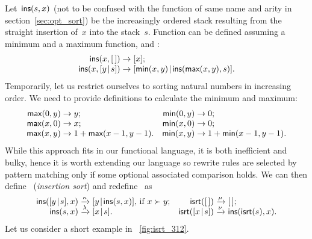 Let~\(\textsf{ins}(s,x)\) (not to be confused with
the function of same name and arity in section~\ref{sec:opt_sort}) be
the increasingly ordered stack resulting from the straight insertion
of~\(x\) into the stack~\(s\). Function  can be defined
assuming a minimum and a maximum function,
 and
:
\begin{equation*}
\begin{array}{@{}r@{\;}l@{\;}l@{}}
\fun{ins}(x,\el) & \rightarrow & [x];\\
\fun{ins}(x,\cons{y}{s}) & \rightarrow &
\cons{\fun{min}(x,y)}{\fun{ins}(\fun{max}(x,y),s)}.
\end{array}
\end{equation*}
Temporarily, let us restrict ourselves to sorting natural numbers in
increasing order. We need to provide definitions to calculate the
minimum and maximum:
\begin{equation*}
\begin{array}{@{}r@{\;}l@{\;}lr@{\;}l@{\;}l@{}}
  \fun{max}(0,y) & \rightarrow & y; & \fun{min}(0,y) & \rightarrow & 0;\\
  \fun{max}(x,0) & \rightarrow & x; & \fun{min}(x,0) & \rightarrow & 0;\\
  \fun{max}(x,y) & \rightarrow & 1 + \fun{max}(x-1,y-1).
& \fun{min}(x,y) & \rightarrow & 1 + \fun{min}(x-1,y-1).
\end{array}
\end{equation*}
While this approach fits in our functional language, it is both
inefficient and bulky, hence it is worth extending our language so
rewrite rules are selected by pattern matching only if some optional
associated comparison holds. We can then
define~ (\emph{insertion sort})
and redefine~ as
\begin{equation*}
\begin{array}{@{}r@{\;}l@{\;}lr@{\;}l@{\;}l@{}}
  \fun{ins}(\cons{y}{s},x)
& \smashedrightarrow{\kappa}
& \cons{y}{\fun{ins}(s,x)}, \,\text{if \(x \succ y\)};
& \fun{isrt}(\el)
& \smashedrightarrow{\mu}
& \el;\\
  \fun{ins}(s,x)
& \smashedrightarrow{\lambda}
& \cons{x}{s}.
& \fun{isrt}(\cons{x}{s})
& \smashedrightarrow{\nu}
& \fun{ins}(\fun{isrt}(s),x).
\end{array}
\end{equation*}
Let us consider a short example in \fig~\vref{fig:isrt_312}.
